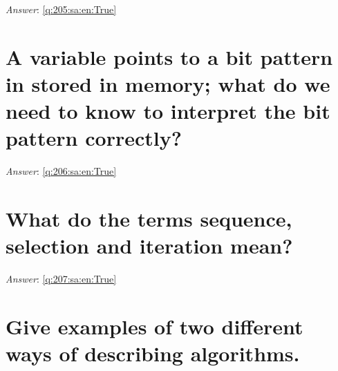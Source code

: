 \documentclass[a4paper,11pt,oneside]{book}
\begin{document}
\begin{sloppypar}
\label{q:205:sa:en:False}

\vspace{2cm}

\noindent\makebox[\textwidth]{\hrulefill}

\vspace{1cm}

\textit{Answer}: \autoref{q:205:sa:en:True}



\section{A variable points to a bit pattern in stored in memory; what do we need to know to interpret the bit pattern correctly?}

\label{q:206:sa:en:False}

\vspace{2cm}

\noindent\makebox[\textwidth]{\hrulefill}

\vspace{1cm}

\textit{Answer}: \autoref{q:206:sa:en:True}



\section{What do the terms sequence, selection and iteration mean?}

\label{q:207:sa:en:False}

\vspace{2cm}

\noindent\makebox[\textwidth]{\hrulefill}

\vspace{1cm}

\textit{Answer}: \autoref{q:207:sa:en:True}



\section{Give examples of two different ways of describing algorithms.}

\label{q:208:sa:en:False}

\vspace{2cm}

\noindent\makebox[\textwidth]{\hrulefill}

\vspace{1cm}


\end{sloppypar}
\end{document}
